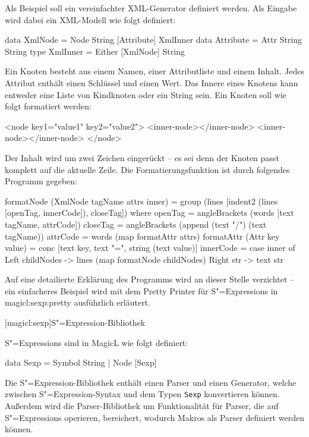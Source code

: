 \documentclass[12pt, a4paper, bibgerm]{scrbook}
\newenvironment{DIFnomarkup}{}{}
\newcommand\icode[1]{\lstinline?#1?}
\newcommand\lsection{}
\newcommand\sref{}
\newcommand{\sexp}{S"=Expression}
\newcommand{\sexps}{S"=Expressions}
\begin{document}
Als Beispiel soll ein vereinfachter XML-Generator definiert werden. Als
Eingabe wird dabei ein XML-Modell wie folgt definiert:
\begin{code}
data XmlNode = Node String [Attribute] XmlInner
data Attribute = Attr String String
type XmlInner = Either [XmlNode] String
\end{code}
Ein Knoten besteht aus einem Namen, einer Attributliste und einem
Inhalt. Jedes Attribut enthält einen Schlüssel und einen Wert. Das
Innere eines Knotens kann entweder eine Liste von Kindknoten oder ein
String sein. Ein Knoten soll wie folgt formatiert werden:
\begin{code}
<node key1="value1" key2="value2">
  <inner-node></inner-node>  
  <inner-node></inner-node>
</node>
\end{code}
Der Inhalt wird um zwei Zeichen eingerückt -- es sei denn der Knoten
passt komplett auf die aktuelle Zeile. Die Formatierungsfunktion ist
durch folgendes Programm gegeben:
\begin{code}
formatNode (XmlNode tagName attrs inner) =
  group (lines [indent2 (lines [openTag, innerCode]), closeTag])
  where openTag  = angleBrackets (words [text tagName, attrCode])
        closeTag = angleBrackets (append (text "/") (text tagName))
        attrCode = words (map formatAttr attrs)
        formatAttr (Attr key value) =
          conc [text key, text "=", string (text value)]
        innerCode = case inner of
                      Left childNodes -> lines (map formatNode childNodes)
                      Right str       -> text str    
\end{code}
Auf eine detailierte Erklärung des Programms wird an dieser Stelle
verzichtet -- ein einfacheres Beispiel wird mit dem Pretty Printer für
\sexps{} in \sref{magicl:sexp:pretty} ausführlich erläutert.

\lsection[magicl:sexp]{\sexp{}-Bibliothek}

\sexps{} sind in MagicL wie folgt definiert:
\begin{DIFnomarkup}\begin{code}
data Sexp = Symbol String
          | Node [Sexp]
\end{code}\end{DIFnomarkup}
Die \sexp{}-Bibliothek enthält einen Parser und einen Generator, welche
zwischen \sexp{}-Syntax und dem Typen \icode{Sexp} konvertieren
können. Außerdem wird die Parser-Bibliothek um Funktionalität für
Parser, die auf \sexps{} operieren, bereichert, wodurch Makros als
Parser definiert werden können.
\end{document}
